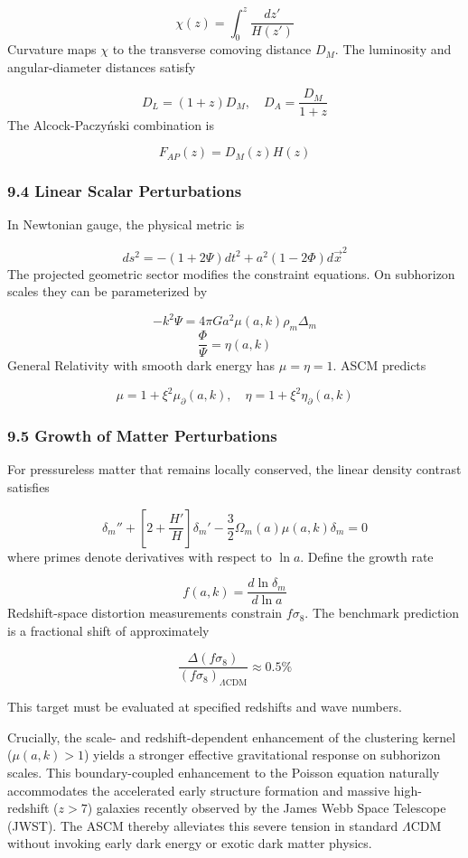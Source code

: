 \documentclass[aps,prd,onecolumn,superscriptaddress,nofootinbib,longbibliography,10pt]{revtex4-2}
\begin{document}
  \[ \chi(z) = \int_0^z \frac{dz'}{H(z')} \]
  Curvature maps \(\chi\) to the transverse comoving distance \(D_M\). The luminosity and angular-diameter distances satisfy


  \[ D_L = (1 + z)D_M, \quad D_A = \frac{D_M}{1 + z} \]
  The Alcock-Paczyński combination is


  \[ F_{AP}(z) = D_M(z)H(z) \]

  
\subsubsection*{9.4 Linear Scalar Perturbations}

  In Newtonian gauge, the physical metric is


  \[ ds^2 = -(1 + 2\Psi)dt^2 + a^2(1 - 2\Phi)d\vec{x}^2 \]
  The projected geometric sector modifies the constraint equations. On subhorizon scales they can be parameterized by


  \[ -k^2 \Psi = 4\pi G a^2 \mu(a,k) \rho_m \Delta_m \]
  \[ \frac{\Phi}{\Psi} = \eta(a,k) \]
  General Relativity with smooth dark energy has \(\mu = \eta = 1\). ASCM predicts


  \[ \mu = 1 + \xi^2 \mu_\partial(a,k), \quad \eta = 1 + \xi^2 \eta_\partial(a,k) \]

  
\subsubsection*{9.5 Growth of Matter Perturbations}

  For pressureless matter that remains locally conserved, the linear density contrast satisfies


  \[ \delta_m'' + \left[ 2 + \frac{H'}{H} \right]\delta_m' - \frac{3}{2}\Omega_m(a)\mu(a,k)\delta_m = 0 \]
  where primes denote derivatives with respect to \(\ln a\). Define the growth rate


  \[ f(a,k) = \frac{d\ln\delta_m}{d\ln a} \]
  Redshift-space distortion measurements constrain \(f\sigma_8\). The benchmark prediction is a fractional shift of approximately


\[\frac{\Delta(f\sigma_{8})}{(f\sigma_{8})_{\Lambda\mathrm{CDM}}} \approx 0.5\%\]


This target must be evaluated at specified redshifts and wave numbers.


Crucially, the scale- and redshift-dependent enhancement of the clustering kernel (\(\mu(a,k) > 1\)) yields a stronger effective gravitational response on subhorizon scales. This boundary-coupled enhancement to the Poisson equation naturally accommodates the accelerated early structure formation and massive high-redshift (\(z > 7\)) galaxies recently observed by the James Webb Space Telescope (JWST). The ASCM thereby alleviates this severe tension in standard \(\Lambda\)CDM without invoking early dark energy or exotic dark matter physics.
\end{document}
